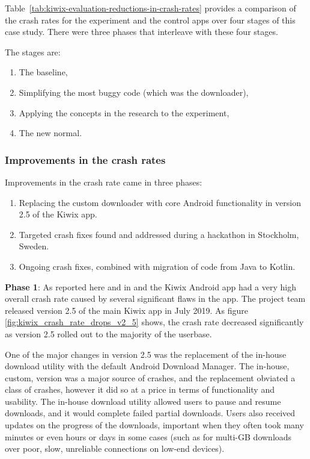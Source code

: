 Table~\ref{tab:kiwix-evaluation-reductions-in-crash-rates} provides a comparison of the crash rates for the experiment and the control apps over four stages of this case study. There were three phases that interleave with these four stages.

The stages are:
\begin{enumerate}
    \item The baseline,
    \item Simplifying the most buggy code (which was the downloader),
    \item Applying the concepts in the research to the experiment,
    \item The new normal.
\end{enumerate}

\subsubsection{Improvements in the crash rates}
Improvements in the crash rate came in three phases:
\begin{enumerate}
    \item Replacing the custom downloader with core Android functionality in version 2.5 of the Kiwix app.
    \item Targeted crash fixes found and addressed during a hackathon in Stockholm, Sweden.
    \item Ongoing crash fixes, combined with migration of code from Java to Kotlin.
\end{enumerate}

\textbf{Phase 1}: As reported here and in \cite{harty_google_play_console_insightful_development_using_android_vitals_and_pre_launch_reports} and \cite{harty_better_android_apps_using_android_vitals} the Kiwix Android app had a very high overall crash rate caused by several significant flaws in the app. The project team released version 2.5 of the main Kiwix app in July 2019. As figure \ref{fig:kiwix_crash_rate_drops_v2_5} shows, the crash rate decreased significantly as version 2.5 rolled out to the majority of the userbase. %

One of the major changes in version 2.5 was the replacement of the in-house download utility with the default Android Download Manager\cite{kiwix_release_2_5_0}. The in-house, custom, version was a major source of crashes, and the replacement obviated a class of crashes, however it did so at a price in terms of functionality and usability. The in-house download utility allowed users to pause and resume downloads, and it would complete failed partial downloads. Users also received updates on the progress of the downloads, important when they often took many minutes or even hours or days in some cases (such as for multi-GB downloads over poor, slow, unreliable connections on low-end devices).

